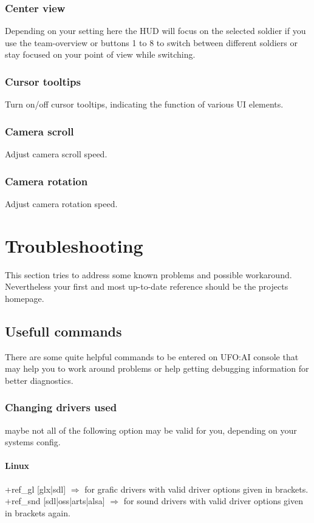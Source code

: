 \subsubsection*{Center view}
Depending on your setting here the HUD will focus on the selected soldier if you use the team-overview or buttons 1 to 8 to switch between different soldiers or stay focused on your point of view while switching.
\subsubsection*{Cursor tooltips}
Turn on/off cursor tooltips, indicating the function of various UI elements.
\subsubsection*{Camera scroll}
Adjust camera scroll  speed.
\subsubsection*{Camera rotation}
Adjust camera rotation speed.

\section{Troubleshooting}
This section tries to address some known problems and possible workaround. Nevertheless your first and most up-to-date reference should be the projects homepage.

\subsection{Usefull commands}
There are some quite helpful commands to be entered on UFO:AI console that may help you to work around problems or help getting debugging information for better diagnostics.
\subsubsection{Changing drivers used}
maybe not all of the following option may be valid for you, depending on your systems config.

\paragraph*{Linux}
+ref\_gl [glx|sdl] $\Longrightarrow$ for grafic drivers with valid driver options given in brackets.
+ref\_snd [sdl|oss|arts|alsa] $\Longrightarrow$ for sound drivers with valid driver options given in brackets 																						again.
